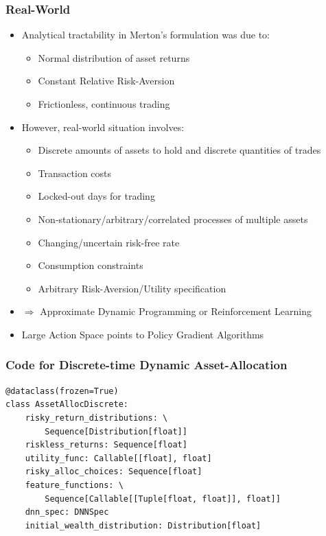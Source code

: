 \documentclass[handout]{beamer}
\begin{document}
\begin{frame}
\frametitle{Real-World}
\pause
\begin{itemize}[<+->]
\item Analytical tractability in Merton's formulation was due to:
\begin{itemize}
\item Normal distribution of asset returns
\item Constant Relative Risk-Aversion
\item Frictionless, continuous trading
\end{itemize}
\item However, real-world situation involves:
\begin{itemize}
\item Discrete amounts of assets to hold and discrete quantities of trades
\item Transaction costs
\item Locked-out days for trading
\item Non-stationary/arbitrary/correlated processes of multiple assets
\item Changing/uncertain risk-free rate
\item Consumption constraints
\item Arbitrary Risk-Aversion/Utility specification
\end{itemize}
\item $\Rightarrow$ Approximate Dynamic Programming or Reinforcement Learning
\item Large Action Space points to Policy Gradient Algorithms
\end{itemize}
\end{frame}


\begin{frame}[fragile]
\frametitle{Code for Discrete-time Dynamic Asset-Allocation}
\pause
\begin{lstlisting}
@dataclass(frozen=True)
class AssetAllocDiscrete:
    risky_return_distributions: \
        Sequence[Distribution[float]]
    riskless_returns: Sequence[float]
    utility_func: Callable[[float], float]
    risky_alloc_choices: Sequence[float]
    feature_functions: \
        Sequence[Callable[[Tuple[float, float]], float]]
    dnn_spec: DNNSpec
    initial_wealth_distribution: Distribution[float]
\end{lstlisting}    
\end{frame}    
\end{document}
